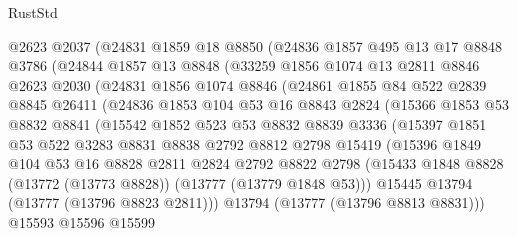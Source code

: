 \begin{lexlean}{RustStd}
\begin{coremodule}
        @2623
        @2037
        (@24831
          @1859
          @18
          @8850
          (@24836
            @1857
            @495
            @13
            @17
            @8848
            @3786
            (@24844
              @1857
              @13
              @8848
              (@33259
                @1856
                @1074
                @13
                @2811
                @8846
                @2623
                @2030
                (@24831
                  @1856
                  @1074
                  @8846
                  (@24861
                    @1855
                    @84
                    @522
                    @2839
                    @8845
                    @26411
                    (@24836
                      @1853
                      @104
                      @53
                      @16
                      @8843
                      @2824
                      (@15366
                        @1853
                        @53
                        @8832
                        @8841
                        (@15542
                          @1852
                          @523
                          @53
                          @8832
                          @8839
                          @3336
                          (@15397
                            @1851
                            @53
                            @522
                            @3283
                            @8831
                            @8838
                            @2792
                            @8812
                            @2798
                            @15419
                            (@15396
                              @1849
                              @104
                              @53
                              @16
                              @8828
                              @2811
                              @2824
                              @2792
                              @8822
                              @2798
                              (@15433
                                @1848
                                @8828
                                (@13772 (@13773 @8828))
                                (@13777 (@13779 @1848 @53)))
                              @15445
                              @13794
                              (@13777 (@13796 @8823 @2811)))
                            @13794
                            (@13777 (@13796 @8813 @8831)))
                          @15593
                          @15596
                          @15599

\end{coremodule}
\end{lexlean}
